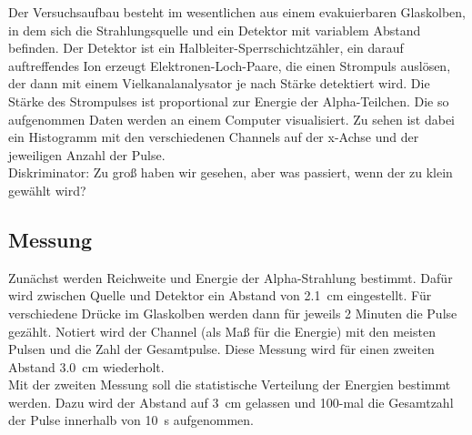 Der Versuchsaufbau besteht im wesentlichen aus einem evakuierbaren Glaskolben, in dem sich die Strahlungsquelle und ein Detektor mit variablem Abstand befinden. Der Detektor ist ein Halbleiter-Sperrschichtzähler, ein darauf auftreffendes Ion erzeugt Elektronen-Loch-Paare, die einen Strompuls auslösen, der dann mit einem Vielkanalanalysator je nach Stärke detektiert wird. Die Stärke des Strompulses ist proportional zur Energie der Alpha-Teilchen. Die so aufgenommen Daten werden an einem Computer visualisiert. Zu sehen ist dabei ein Histogramm mit den verschiedenen Channels auf der x-Achse und der jeweiligen Anzahl der Pulse. \\
Diskriminator: Zu groß haben wir gesehen, aber was passiert, wenn der zu klein gewählt wird? \\
\subsection*{Messung}
Zunächst werden Reichweite und Energie der Alpha-Strahlung bestimmt. Dafür wird zwischen Quelle und Detektor ein Abstand von \SI{2.1}{\centi\meter} eingestellt. Für verschiedene Drücke im Glaskolben werden dann für jeweils 2 Minuten die Pulse gezählt. Notiert wird der Channel (als Maß für die Energie) mit den meisten Pulsen und die Zahl der Gesamtpulse. Diese Messung wird für einen zweiten Abstand \SI{3.0}{\centi\meter} wiederholt. \\
Mit der zweiten Messung soll die statistische Verteilung der Energien bestimmt werden. Dazu wird der Abstand auf \SI{3}{\centi\meter} gelassen und 100-mal die Gesamtzahl der Pulse innerhalb von \SI{10}{\second} aufgenommen.
